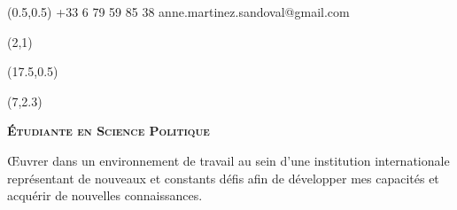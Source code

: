 \documentclass[30pt, french]{tccv}
\begin{document}
\begin{upshape}
\fontsize{10pt}{1.1em}\color{text}\selectfont



%
%




\begin{textblock}{6.5}(0.5,0.5)
    {+33 6 79 59 85 38}
    {anne.martinez.sandoval@gmail.com}
\end{textblock}

\begin{textblock}{21}(2,1)
\end{textblock}

\begin{textblock}{21}(17.5,0.5)
\end{textblock}  



\begin{textblock}{11}(7,2.3)
\begin{center}
\fontsize{10pt}{1.5em}\color{text}\bodyfontlight\upshape\selectfont

	{\fontsize{14pt}{5em}\scshape\bfseries \'Etudiante en Science Politique\\} 

	\vspace{5pt}
Œuvrer dans un environnement de travail au sein d’une institution internationale représentant de nouveaux et constants défis afin de développer mes capacités et acquérir de nouvelles connaissances. 
\end{center}
\end{textblock}  





%
%


\end{upshape}
\end{document}
